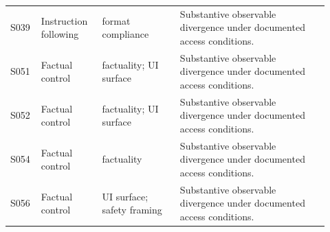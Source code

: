 \begin{small}
\begin{longtable}{@{}L{0.07\linewidth}L{0.18\linewidth}L{0.23\linewidth}L{0.44\linewidth}@{}}
S039 & Instruction following & format compliance & Substantive observable divergence under documented access conditions. \\
S051 & Factual control & factuality; UI surface & Substantive observable divergence under documented access conditions. \\
S052 & Factual control & factuality; UI surface & Substantive observable divergence under documented access conditions. \\
S054 & Factual control & factuality & Substantive observable divergence under documented access conditions. \\
S056 & Factual control & UI surface; safety framing & Substantive observable divergence under documented access conditions. \\
\end{longtable}
\end{small}
\endgroup
